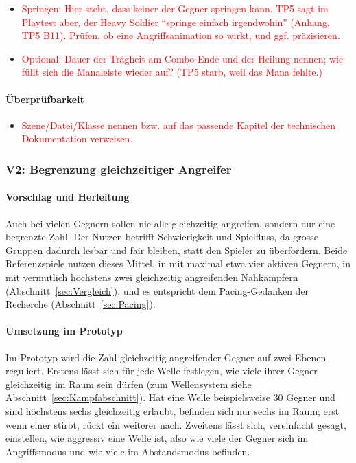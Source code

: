 \documentclass[../Main.tex]{subfiles}
\begin{document}
\begin{itemize}[leftmargin=1.5cm]
    \item \textcolor{red}{Springen: Hier steht, dass keiner der Gegner springen kann. TP5 sagt im Playtest aber, der Heavy Soldier \enquote{springe einfach irgendwohin} (Anhang, TP5 B11). Prüfen, ob eine Angriffsanimation so wirkt, und ggf. präzisieren.}
    \item \textcolor{red}{Optional: Dauer der Trägheit am Combo-Ende und der Heilung nennen; wie füllt sich die Manaleiste wieder auf? (TP5 starb, weil das Mana fehlte.)}
\end{itemize}

\paragraph{Überprüfbarkeit}
\begin{itemize}[leftmargin=1.5cm]
    \item \textcolor{red}{Szene/Datei/Klasse nennen bzw. auf das passende Kapitel der technischen Dokumentation verweisen.}
\end{itemize}

\subsubsection{V2: Begrenzung gleichzeitiger Angreifer} \label{sec:V2}

\paragraph{Vorschlag und Herleitung}
Auch bei vielen Gegnern sollen nie alle gleichzeitig angreifen, sondern nur eine begrenzte Zahl. Der Nutzen betrifft Schwierigkeit und Spielfluss, da grosse Gruppen dadurch lesbar und fair bleiben, statt den Spieler zu überfordern. Beide Referenzspiele nutzen dieses Mittel, in  mit maximal etwa vier aktiven Gegnern, in  mit vermutlich höchstens zwei gleichzeitig angreifenden Nahkämpfern (Abschnitt~\ref{sec:Vergleich}), und es entspricht dem Pacing-Gedanken der Recherche (Abschnitt~\ref{sec:Pacing}).

\paragraph{Umsetzung im Prototyp}
Im Prototyp wird die Zahl gleichzeitig angreifender Gegner auf zwei Ebenen reguliert. Erstens lässt sich für jede Welle festlegen, wie viele ihrer Gegner gleichzeitig im Raum sein dürfen (zum Wellensystem siehe Abschnitt~\ref{sec:Kampfabschnitt}). Hat eine Welle beispielsweise 30 Gegner und sind höchstens sechs gleichzeitig erlaubt, befinden sich nur sechs im Raum; erst wenn einer stirbt, rückt ein weiterer nach. Zweitens lässt sich, vereinfacht gesagt, einstellen, wie aggressiv eine Welle ist, also wie viele der Gegner sich im Angriffsmodus und wie viele im Abstandsmodus befinden.
\end{document}
